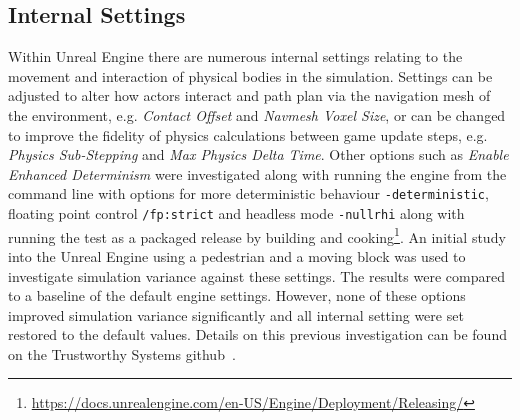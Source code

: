 \documentclass[letterpaper, 10 pt, journal, twoside]{IEEEtran}
\begin{document}


\subsection{Internal Settings}

Within Unreal Engine there are numerous internal settings relating to the movement and interaction of physical bodies in the simulation. Settings can be adjusted to alter how actors interact and path plan via the navigation mesh of the environment, e.g. \textit{Contact Offset} and \textit{Navmesh Voxel Size}, or can be changed to improve the fidelity of physics calculations between game update steps, e.g. \textit{Physics Sub-Stepping} and \textit{Max Physics Delta Time}. Other options such as \textit{Enable Enhanced Determinism} were investigated along with running the engine from the command line with options for more deterministic behaviour \texttt{-deterministic}, floating point control \texttt{/fp:strict} and headless mode \texttt{-nullrhi} along with running the test as a packaged release by building and cooking\footnote{\url{https://docs.unrealengine.com/en-US/Engine/Deployment/Releasing/}}. 
An initial study into the Unreal Engine using a pedestrian and a moving block was used to investigate simulation variance against these settings. The results were compared to a baseline of the default engine settings. 
%
However, none of these options improved simulation variance significantly and all internal setting were set restored to the default values. Details on this previous investigation can be found on the Trustworthy Systems github~\cite{TSLUnrealEngineTesting}.
\end{document}
